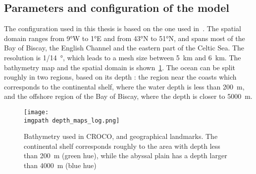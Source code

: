 \documentclass[../../Main_ManuscritThese.tex]{subfiles}
\newcommand{\CROCO}{CROCO}
\newcommand\imgpath{/home/victor/acadwriting/Manuscrit/Text/Chapter5/img/}
\begin{document}
\subsection{Parameters and configuration of the model}
\label{sec:geographical_setting}

The configuration used in this thesis is based on the one used
in~\cite{boutet_estimation_2015}. The spatial domain ranges from
\ang{9}W to \ang{1}E and from \ang{43}N to \ang{51}N, and spans most
of the Bay of Biscay, the English Channel and the eastern part of the
Celtic Sea.  The resolution is \SI{1/14}{\degree}, which leads to a
mesh size between \SI{5}{\kilo\metre} and \SI{6}{\kilo\metre}. The
bathymetry map and the spatial domain is
shown~\cref{fig:depth_maps}. The ocean can be split roughly in two
regions, based on its depth : the region near the coasts which
corresponds to the continental shelf, where the water depth is less
than \SI{200}{\meter}, and the offshore region of the Bay of Biscay,
where the depth is closer to \SI{5000}{\meter}.
\begin{figure}[ht]
  \centering
  \texttt{[image: \\imgpath depth\_maps\_log.png]}
  \caption[Bathymetry chart of the domain
  modelled]{\label{fig:depth_maps} Bathymetry used in \CROCO, and
    geographical landmarks. The continental shelf corresponds roughly
    to the area with depth less than \SI{200}{\meter} (green hue),
    while the abyssal plain has a depth larger than \SI{4000}{\meter}
    (blue hue)}
\end{figure}
\end{document}
